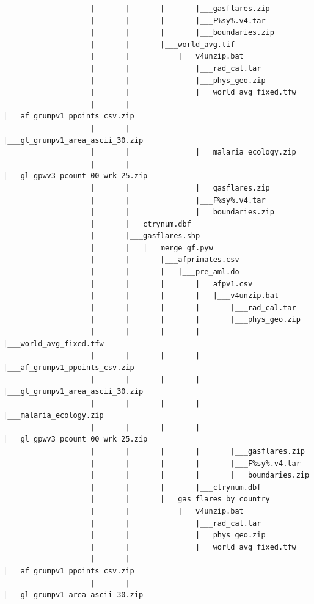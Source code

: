\documentclass[
]{book}
\begin{document}
\begin{verbatim}
                    |       |       |       |___gasflares.zip
                    |       |       |       |___F%sy%.v4.tar
                    |       |       |       |___boundaries.zip
                    |       |       |___world_avg.tif
                    |       |           |___v4unzip.bat
                    |       |               |___rad_cal.tar
                    |       |               |___phys_geo.zip
                    |       |               |___world_avg_fixed.tfw
                    |       |               |___af_grumpv1_ppoints_csv.zip
                    |       |               |___gl_grumpv1_area_ascii_30.zip
                    |       |               |___malaria_ecology.zip
                    |       |               |___gl_gpwv3_pcount_00_wrk_25.zip
                    |       |               |___gasflares.zip
                    |       |               |___F%sy%.v4.tar
                    |       |               |___boundaries.zip
                    |       |___ctrynum.dbf
                    |       |___gasflares.shp
                    |       |   |___merge_gf.pyw
                    |       |       |___afprimates.csv
                    |       |       |   |___pre_aml.do
                    |       |       |       |___afpv1.csv
                    |       |       |       |   |___v4unzip.bat
                    |       |       |       |       |___rad_cal.tar
                    |       |       |       |       |___phys_geo.zip
                    |       |       |       |       |___world_avg_fixed.tfw
                    |       |       |       |       |___af_grumpv1_ppoints_csv.zip
                    |       |       |       |       |___gl_grumpv1_area_ascii_30.zip
                    |       |       |       |       |___malaria_ecology.zip
                    |       |       |       |       |___gl_gpwv3_pcount_00_wrk_25.zip
                    |       |       |       |       |___gasflares.zip
                    |       |       |       |       |___F%sy%.v4.tar
                    |       |       |       |       |___boundaries.zip
                    |       |       |       |___ctrynum.dbf
                    |       |       |___gas flares by country
                    |       |           |___v4unzip.bat
                    |       |               |___rad_cal.tar
                    |       |               |___phys_geo.zip
                    |       |               |___world_avg_fixed.tfw
                    |       |               |___af_grumpv1_ppoints_csv.zip
                    |       |               |___gl_grumpv1_area_ascii_30.zip

\end{verbatim}
\end{document}
